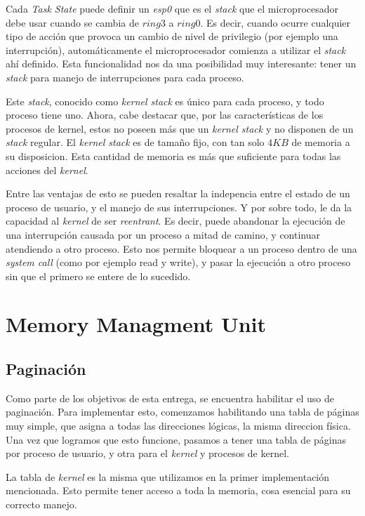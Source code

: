 \documentclass[a4paper,10pt]{article}
\begin{document}
Cada \textit{Task State} puede definir un \textit{esp0} que es el \textit{stack} que el microprocesador debe usar cuando se cambia de $ring 3$ a $ring 0$.
Es decir, cuando ocurre cualquier tipo de acción que provoca un cambio de nivel de privilegio (por ejemplo una interrupción), automáticamente el microprocesador 
comienza a utilizar el \textit{stack} ahí definido.
Esta funcionalidad nos da una posibilidad muy interesante: tener un \textit{stack} para manejo de interrupciones para cada proceso.

Este \textit{stack}, conocido como \textit{kernel stack} es único para cada proceso, y todo proceso tiene uno.
Ahora, cabe destacar que, por las características de los procesos de kernel, estos no poseen más que un \textit{kernel stack} y no disponen de un \textit{stack} regular.
El \textit{kernel stack} es de tamaño fijo, con tan solo $ 4KB $ de memoria a su disposicion.
Esta cantidad de memoria es más que suficiente para todas las acciones del \textit{kernel}.

Entre las ventajas de esto se pueden resaltar la indepencia entre el estado de un proceso de usuario, y el manejo de sus interrupciones.
Y por sobre todo, le da la capacidad al \textit{kernel} de ser \textit{reentrant}.
Es decir, puede abandonar la ejecución de una interrupción causada por un proceso a mitad de camino, y continuar atendiendo a otro proceso.
Esto nos permite bloquear a un proceso dentro de una \textit{system call} (como por ejemplo read y write), y pasar la ejecución a otro proceso sin que el primero 
se entere de lo sucedido.

\newpage
\section{Memory Managment Unit}

\subsection{Paginación}
\label{sec:Paginación}
Como parte de los objetivos de esta entrega, se encuentra habilitar el uso de paginación.
Para implementar esto, comenzamos habilitando una tabla de páginas muy simple, que asigna a todas las direcciones lógicas, la misma direccion física.
Una vez que logramos que esto funcione, pasamos a tener una tabla de páginas por proceso de usuario, y otra para el \textit{kernel} y procesos de kernel.

La tabla de \textit{kernel} es la misma que utilizamos en la primer implementación mencionada.
Esto permite tener acceso a toda la memoria, cosa esencial para su correcto manejo.
\end{document}
